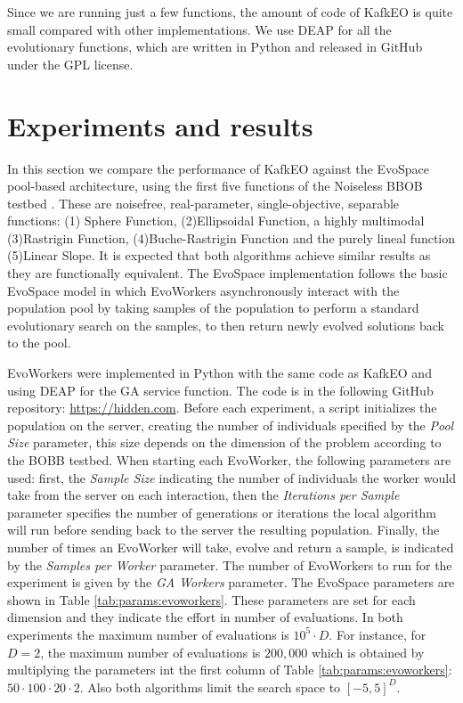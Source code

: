 \documentclass[sigconf]{acmart}
\begin{document}
Since we are running just a few functions, the amount of code of KafkEO
is quite small compared with other implementations. We use DEAP for
all the evolutionary functions, which are written in Python and
released in GitHub under the GPL license.

\section{Experiments and results}
\label{sec:res}
In this section we compare the performance of KafkEO against 
the EvoSpace \cite{GValdez2015}  pool-based architecture, using the first five
functions of the Noiseless BBOB testbed \cite{hansen2016coco}. 
These are noisefree, real-parameter, single-objective, separable functions: (1)
Sphere Function, (2)Ellipsoidal Function, a highly multimodal (3)Rastrigin 
Function, (4)Buche-Rastrigin Function and the purely lineal function (5)Linear 
Slope. It is expected that both algorithms achieve similar results as 
they are functionally equivalent. The EvoSpace implementation follows the 
basic EvoSpace model in which EvoWorkers  asynchronously interact with the
population pool by taking samples of the population to perform a standard
evolutionary search on the samples, to then return newly evolved solutions back
to the pool.  

EvoWorkers were implemented in Python with the same code as KafkEO and using 
DEAP \cite{fortin2012deap} for the GA service function. The code is in the
following GitHub repository: \url{https://hidden.com}. Before each
experiment, a script initializes the population on the server, creating the
number of individuals specified by the {\em Pool Size} parameter, this
size depends on the dimension of the problem according to the BOBB testbed. 
When starting each EvoWorker, the following parameters are used: first, the
{\em Sample Size} indicating the number of individuals the worker would take
from the server on each interaction, then the {\em Iterations per Sample} 
parameter specifies the number of generations or iterations the local algorithm
will run before sending back to the server the resulting population. Finally,
the number of times an  EvoWorker will take, evolve and return a sample, is 
indicated by the {\em Samples per Worker} parameter. The number of EvoWorkers to run for the experiment is given by the {\em GA Workers} parameter.  The EvoSpace parameters 
are shown in Table \ref{tab:params:evoworkers}.
 These parameters are set for  
each dimension and they indicate the effort in number of evaluations. In both
 experiments the maximum number of evaluations is $10^5 \cdot D$. For instance, 
 for $D = 2$, the maximum number of evaluations is $200,000$ which is obtained by multiplying
  the parameters int the first column of Table \ref{tab:params:evoworkers}: $50 \cdot 100 \cdot 20 \cdot 2$. Also both algorithms limit the search space to $[-5,5]^D$. 
\end{document}
